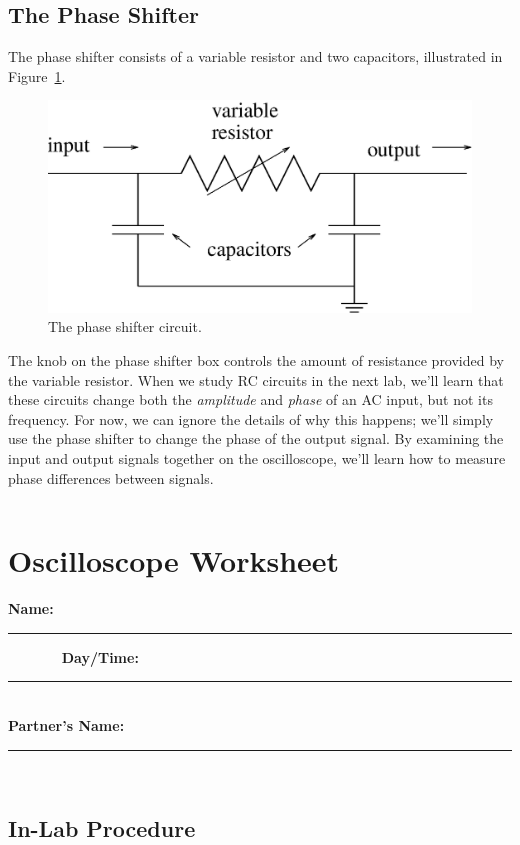 \subsection{The Phase Shifter}

The phase shifter consists of a variable resistor and two capacitors, 
illustrated in Figure~\ref{fig:scope:phaseshifter}.
\begin{figure}[htb]
\centering \epsfxsize=8cm \includegraphics[scale=0.7]{4_oscilloscope/phaseshifter.eps}
\caption{The phase shifter circuit.}
\label{fig:scope:phaseshifter}
\end{figure}
The knob on the phase shifter box controls the amount of resistance provided
by the variable resistor.  When we study RC circuits in the next lab, we'll
learn that these circuits change both the {\it amplitude} and {\it phase} of
an AC input, but not its frequency.  For now, we can ignore the details of
why this happens; we'll simply use the phase shifter to change the phase of the
output signal.  By examining the input and output signals together on the 
oscilloscope, we'll learn how to measure phase differences between signals.

\vfill
\pagebreak
$$
$$
\vfill
\clearpage
\newpage


\renewcommand{\thesection}{\thechapter.W}

\section{Oscilloscope Worksheet}

{\bf \Large Name:}~ \rule{5cm}{.1mm}~~~~~~~
{\bf \Large Day/Time:}~\rule{3cm}{.1mm}\\
{\bf \Large Partner's Name:}~\rule{6cm}{.1mm}\\
   \subsection{In-Lab Procedure}

